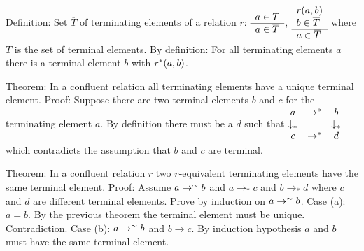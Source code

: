\documentclass{article}
\begin{document}
Definition: Set $\overline T$ of terminating elements of a relation $r$:
$\begin{array}{l} a\in T \\ \hline a\in \overline T\end{array}$, $\begin{array}{l} r(a,b) \\ b\in\overline T \\ \hline a\in
  \overline T\end{array}$ where $T$ is the set of terminal elements. By definition: For
all terminating elements $a$ there is a terminal element $b$ with $r^*(a,b)$.

Theorem: In a confluent relation all terminating elements have a unique
terminal element. Proof: Suppose there are two terminal elements $b$ and $c$
for the terminating element $a$. By definition there must be a $d$ such that
$\begin{matrix} a & \to^* & b \\
  \downarrow_* & & \downarrow_* \\
  c & \to^* & d
\end{matrix}$
which contradicts the assumption that $b$ and $c$ are terminal.


Theorem: In a confluent relation $r$ two $r$-equivalent terminating elements have the same
terminal element.
Proof: Assume $a \to^\sim b$ and $a \to_* c$ and $b \to_* d$
where $c$ and $d$ are different terminal elements. Prove by induction on $a
\to^\sim b$. Case (a): $a=b$. By the previous theorem the terminal element
must be unique. Contradiction. Case (b): $a \to^\sim b$ and $b \to c$. By
induction hypothesis $a$ and $b$ must have the same terminal element.
\end{document}
